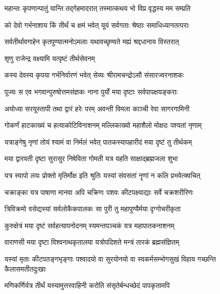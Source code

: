 \twolineshloka
{महान्तः कृपणान्पातुं यान्ति तद्गेहमादरात्}
{तस्मात्कथय भो विप्र वृद्धस्य मम सम्प्रति}%

\twolineshloka
{को देवो गर्भनाशाय किं तीर्थं च क्षमं भवेत्}
{यूयं सर्वगताः श्रेष्ठाः समाधिध्यानतत्पराः}%

\twolineshloka
{सर्वतीर्थावगाहेन कृतपुण्यात्मनोऽमलाः}
{यथावच्छृण्वते मह्यं श्रद्दधानाय विस्तरात्}%



\onelineshloka
{शृणु राजेन्द्र वक्ष्यामि यत्पृष्टं तीर्थसेवनम्}%

\twolineshloka
{कस्य देवस्य कृपया गर्भनिर्वारणं भवेत्}
{सेव्यः श्रीरामचन्द्रोऽसौ संसारज्वरनाशकः}%

\twolineshloka
{पूज्यः स एव भगवान्पुरुषोत्तमसंज्ञकः}
{नाना पुर्यो मया दृष्टाः सर्वपापक्षयङ्कराः}%

\twolineshloka
{अयोध्या सरयूस्तापी तथा द्वारं हरेः परम्}
{अवन्ती विमला काञ्ची रेवा सागरगामिनी}%

\twolineshloka
{गोकर्णं हाटकाख्यं च हत्याकोटिविनाशनम्}
{मल्लिकाख्यो महाशैलो मोक्षदः पश्यतां नृणाम्}%

\twolineshloka
{यत्राङ्गेषु नृणां तोयं श्यामं वा निर्मलं भवेत्}
{पातकस्यापहारीदं मया दृष्टं तु तीर्थकम्}%

\twolineshloka
{मया द्वारवती दृष्टा सुरासुर निषेविता}
{गोमती यत्र वहति साक्षाद्ब्रह्मजला शुभा}%

\twolineshloka
{यत्र स्वापो लयः प्रोक्तो मृतिर्मोक्ष इति श्रुतिः}
{यस्यां संवसतां नॄणां न कलि प्रभवेत्क्वचित्}%

\twolineshloka
{चक्राङ्का यत्र पाषाणा मानवा अपि चक्रिणः}
{पशवः कीटपक्ष्याद्याः सर्वे चक्रशरीरिणः}%

\twolineshloka
{त्रिविक्रमो वसेद्यस्यां सर्वलोकैकपालकः}
{सा पुरी तु महापुण्यैर्मया दृग्गोचरीकृता}%

\twolineshloka
{कुरुक्षेत्रं मया दृष्टं सर्वहत्यापनोदनम्}
{स्यमन्तपञ्चकं यत्र महापातकनाशनम्}%

\twolineshloka
{वाराणसी मया दृष्टा विश्वनाथकृतालया}
{यत्रोपदिशते मन्त्रं तारकं ब्रह्मसंज्ञितम्}%

\fourlineindentedshloka
{यस्यां मृताः कीटपतङ्गभृङ्गाः}
{पश्वादयो वा सुरयोनयो वा}
{स्वकर्मसम्भोगसुखं विहाय}
{गच्छन्ति कैलासमतीतदुःखाः}%

\twolineshloka
{मणिकर्णिर्यत्र तीर्थं यस्यामुत्तरवाहिनी}
{करोति संसृतेर्बन्धच्छेदं पापकृतामपि}%

